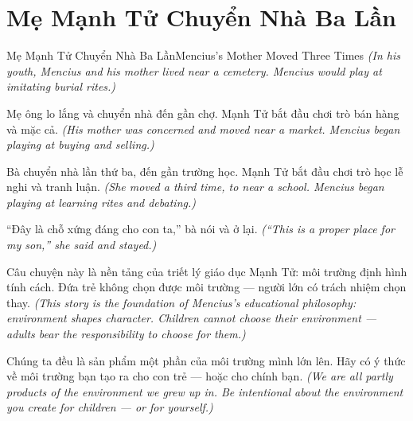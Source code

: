\section{Mẹ Mạnh Tử Chuyển Nhà Ba Lần}
\begin{truyen}{Mẹ Mạnh Tử Chuyển Nhà Ba Lần}{Mencius's Mother Moved Three Times}
\textit{(In his youth, Mencius and his mother lived near a cemetery. Mencius would play at imitating burial rites.)}

Mẹ ông lo lắng và chuyển nhà đến gần chợ. Mạnh Tử bắt đầu chơi trò bán hàng và mặc cả.
\textit{(His mother was concerned and moved near a market. Mencius began playing at buying and selling.)}

Bà chuyển nhà lần thứ ba, đến gần trường học. Mạnh Tử bắt đầu chơi trò học lễ nghi và tranh luận.
\textit{(She moved a third time, to near a school. Mencius began playing at learning rites and debating.)}

``Đây là chỗ xứng đáng cho con ta,'' bà nói và ở lại.
\textit{(``This is a proper place for my son,'' she said and stayed.)}

Câu chuyện này là nền tảng của triết lý giáo dục Mạnh Tử: môi trường định hình tính cách. Đứa trẻ không chọn được môi trường — người lớn có trách nhiệm chọn thay.
\textit{(This story is the foundation of Mencius's educational philosophy: environment shapes character. Children cannot choose their environment — adults bear the responsibility to choose for them.)}

\end{truyen}

\begin{baihoc}
Chúng ta đều là sản phẩm một phần của môi trường mình lớn lên. Hãy có ý thức về môi trường bạn tạo ra cho con trẻ — hoặc cho chính bạn.
\textit{(We are all partly products of the environment we grew up in. Be intentional about the environment you create for children — or for yourself.)}
\end{baihoc}
\ngancach

